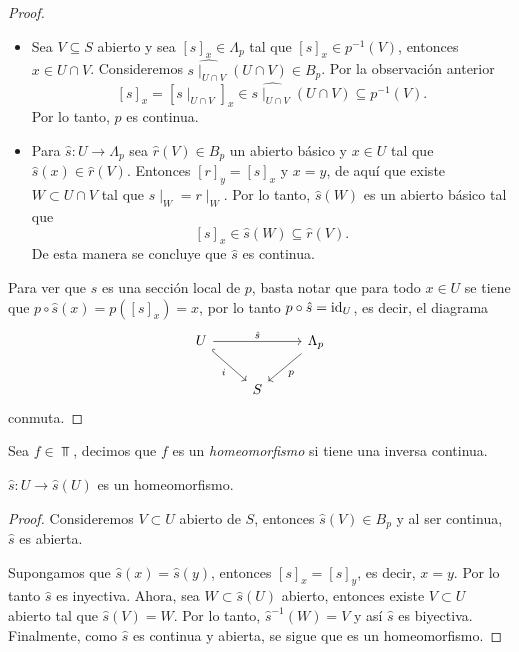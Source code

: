 \begin{proof}
\begin{itemize}
\item Sea $V\subseteq S$ abierto y sea $[s]_x\in \Lambda_p$ tal que $[s]_x\in p^{-1}(V)$, entonces $x\in U\cap V$. Consideremos $\widehat{s\mid_{U\cap V}}(U\cap V)\in B_p$. Por la observación 
anterior 
\[
[s]_x=[s\mid_{U\cap V}]_x\in \widehat{s\mid_{U\cap V}}(U\cap V)\subseteq p^{-1}(V).
\]
Por lo tanto, $p$ es continua.

\item Para $\hat{s}\colon U\to \Lambda_p$ sea $\hat{r}(V)\in B_p$ un abierto básico y $x\in U$ tal que $\hat{s}(x)\in \hat{r}(V)$. Entonces $[r]_y=[s]_x$ y $x=y$, de aquí que existe $W\subset U\cap V$ tal que 
$s\mid_W=r\mid_W$. Por lo tanto, $\hat{s}(W)$ es un abierto básico tal que 
\[
[s]_x\in \hat{s}(W)\subseteq \hat{r}(V).
\]
De esta manera se concluye que $\hat{s}$ es continua.
\end{itemize}
Para ver que $\hat{s}$ es una sección local de $p$, basta notar que para todo $x\in U$ se tiene que $p\circ \hat{s}(x)=p([s]_x)=x$, por lo tanto 
$p\circ \hat{s}={\mathrm{id}}_U$, es decir, el diagrama
\[\begin{tikzcd}
	U && {\Lambda_p} \\
	& S
	\arrow["{\hat{s}}", from=1-1, to=1-3]
	\arrow["i"', hook, from=1-1, to=2-2]
	\arrow["p", from=1-3, to=2-2]
\end{tikzcd}\]
conmuta.
\end{proof}

\begin{definition}
Sea $f\in \Top$, decimos que $f$ es un \emph{homeomorfismo} si tiene una inversa continua.
\end{definition}

\begin{lema}
    $\hat{s}\colon U\to \hat{s}(U)$ es un homeomorfismo.
\end{lema}

\begin{proof}
Consideremos $V\subset U$ abierto de $S$, entonces $\hat{s}(V)\in B_p$ y al ser continua, $\hat{s}$ es abierta.

Supongamos que $\hat{s}(x)=\hat{s}(y)$, entonces $[s]_x=[s]_y$, es decir, $x=y$. Por lo tanto $\hat{s}$ es inyectiva. Ahora, sea $W\subset \hat{s}(U)$ abierto, entonces existe $V\subset U$ abierto tal que $\hat{s}(V)=W$. Por lo tanto, $\hat{s}^{-1}(W)=V$ y así $\hat{s}$ es biyectiva. 
Finalmente, como $\hat{s}$ es continua y abierta, se sigue que es un homeomorfismo.
\end{proof}

